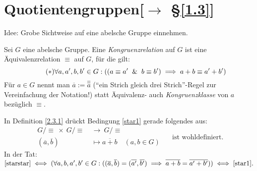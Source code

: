 \documentclass[../../main.tex]{subfiles}
\begin{document}
\section[tocentry={Quotientengruppen}]{Quotientengruppen{\small [$\to$ §\ref{1.3}]}}\label{2.3}

\noindent
Idee: Grobe Sichtweise auf eine abelsche Gruppe einnehmen.

\begin{df} \label{2.3.1}
Sei $G$ eine abelsche Gruppe. Eine \emph{Kongruenzrelation} auf $G$ ist eine Äquivalenzrelation $\equiv$ auf $G$, für die gilt:
\begin{equation}\tag{$*$}\label{star1}
\forall a,a',b,b'\in G:((a\equiv a' ~\mathbin{\&}~ b\equiv b')\implies a+b\equiv a'+b')
\end{equation}
Für $a\in G$ nennt man $\overline a:=\overset\equiv a$ ("`ein Strich gleich drei Strich"'-Regel zur Vereinfachung der Notation!) statt Äquivalenz- auch \emph{Kongruenzklasse} von $a$ bezüglich $\equiv$.
\end{df}

\begin{bem}\label{2.3.2}
In Definition \ref{2.3.1} drückt Bedingung \eqref{star1} gerade folgendes aus:
\begin{equation}\tag{$**$}\label{starstar}
\begin{aligned}
G/\mbox{$\equiv$}~\times~G/\mbox{$\equiv$}~ & \to~G/\mbox{$\equiv$}\\
(\overline a,\overline b) & \mapsto\overline{a+b}\quad(a,b\in G)
\end{aligned}
\quad
\text{ ist wohldefiniert.}
\end{equation}
In der Tat: $\eqref{starstar}\iff(\forall a,b,a',b'\in G:((\overline a,\overline b)=(\overline{a'},\overline{b'})\implies\overline{a+b}=\overline{a'+b'}))\iff\eqref{star1}.$
\end{bem}
\end{document}
